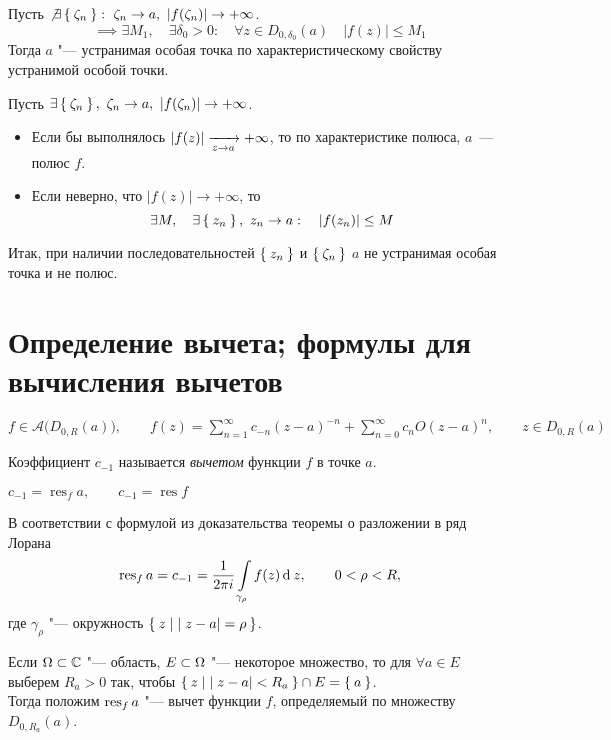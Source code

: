 \begin{iproof}
	\item Пусть $ \not\exists \Set{\zeta_n} : ~ \zeta_n \to a, ~ |f(\zeta_n)| \to +\infty $.
	$$ \implies \exists M_1, \quad \exists \delta_0 > 0 : \quad \forall z \in D_{0, \delta_0}(a) \quad |f(z)| \le M_1 $$
	Тогда $ a $ "--- устранимая особая точка по характеристическому свойству устранимой особой точки.

	\item Пусть $ \exists \Set{\zeta_n}, ~ \zeta_n \to a, ~ |f(\zeta_n)| \to +\infty $.
	\begin{itemize}
		\item Если бы выполнялось $ |f(z)| \xrightarrow[z \to a]{} +\infty $, то по характеристике полюса, $ a $~--- полюс $ f $.
		\item Если неверно, что $ |f(z)| \to +\infty $, то
		$$ \exists M, \quad \exists \Set{z_n}, ~ z_n \to a : \quad |f(z_n)| \le M $$
	\end{itemize}

	Итак, при наличии последовательностей $ \Set{z_n} $ и $ \Set{\zeta_n} $ $ a $ не устранимая особая точка и не полюс.
\end{iproof}

\section{Определение вычета; формулы для вычисления вычетов}

\begin{definition}
	$ f \in \mathcal A(D_{0, R}(a) \big), \qquad f(z) = \sum_{n = 1}^\infty c_{-n}(z - a)^{-n} + \sum_{n = 0}^\infty c_nO(z - a)^n, \qquad z \in D_{0, R}(a) $

	Коэффициент $ c_{-1} $ называется \emph{вычетом} функции $ f $ в точке $ a $.
\end{definition}

\begin{notation}
	$ c_{-1} = \operatorname{res}_f a, \qquad c_{-1} = \operatorname{res} f $
\end{notation}

В соответствии с формулой  из доказательства теоремы о разложении в ряд Лорана
$$ \operatorname{res}_f a = c_{-1} = \frac1{2\pi i} \int\limits_{\gamma_\rho} f(z) \operatorname{d}^{} z, \qquad 0 < \rho < R, $$
где $ \gamma_\rho $ "--- окружность $ \Set{z \mid |z - a| = \rho} $.

Если $ \Omega \subset \mathbb{C} $ "--- область, $ E \subset \Omega $ "--- некоторое множество, то для $ \forall a \in E $ выберем $ R_a > 0 $ так, чтобы $ \Set{z \mid |z - a| < R_a} \cap E = \Set a $. \\
Тогда положим $ \operatorname{res}_f a $ "--- вычет функции $ f $, определяемый по множеству $ D_{0, R_a}(a) $.

